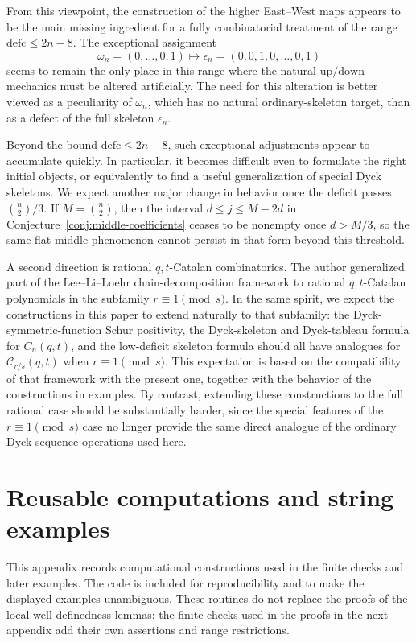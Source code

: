 \documentclass[11pt]{article}
\theoremstyle{plain}
\theoremstyle{definition}
\theoremstyle{remark}
\newcommand{\defc}{\mathrm{defc}}
\begin{document}
From this viewpoint, the construction of the higher East--West maps appears to
be the main missing ingredient for a fully combinatorial treatment of the range
\(\defc\le 2n-8\).  The exceptional assignment
\[
  \omega_n=(0,\ldots,0,1)
  \longmapsto
  \epsilon_n=(0,0,1,0,\ldots,0,1)
\]
seems to remain the only place in this range where the natural
\(\mathrm{up}/\mathrm{down}\) mechanics must be altered artificially.  The
need for this alteration is better viewed as a peculiarity of \(\omega_n\),
which has no natural ordinary-skeleton target, than as a defect of the full
skeleton \(\epsilon_n\).

Beyond the bound \(\defc\le 2n-8\), such exceptional adjustments appear to
accumulate quickly.  In particular, it becomes difficult even to formulate the
right initial objects, or equivalently to find a useful generalization of
special Dyck skeletons.  We expect another major change in behavior once the
deficit passes \(\binom n2/3\).  If \(M=\binom n2\), then the interval
\(d\le j\le M-2d\) in Conjecture~\ref{conj:middle-coefficients} ceases to be
nonempty once \(d>M/3\), so the same flat-middle phenomenon cannot persist in
that form beyond this threshold.

A second direction is rational \(q,t\)-Catalan combinatorics.  The author
generalized part of the Lee--Li--Loehr chain-decomposition framework to
rational \(q,t\)-Catalan polynomials in the subfamily
\(r\equiv1\pmod{s}\).  In the same spirit, we expect the constructions in this
paper to extend naturally to that subfamily: the Dyck-symmetric-function Schur
positivity, the Dyck-skeleton and Dyck-tableau formula for \(C_n(q,t)\), and
the low-deficit skeleton formula should all have analogues for
\(\mathcal C_{r/s}(q,t)\) when \(r\equiv1\pmod{s}\).  This expectation is based
on the compatibility of that framework with the present one, together with
the behavior of the constructions in examples.  By contrast, extending these
constructions to the full rational case should be substantially harder, since
the special features of the \(r\equiv1\pmod{s}\) case no longer provide the
same direct analogue of the ordinary Dyck-sequence operations used here.

\appendix

\section{Reusable computations and string examples}
\label{app:computations}
This appendix records computational constructions used in the finite
checks and later examples.  The code is included for reproducibility and
to make the displayed examples unambiguous.
These routines do not replace the proofs of the local well-definedness lemmas: the
finite checks used in the proofs in the next appendix add their own
assertions and
range restrictions.
\end{document}

